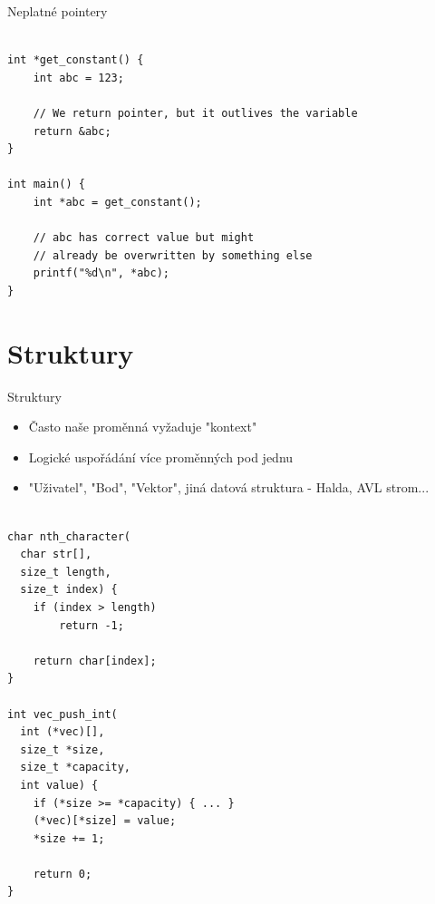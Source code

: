 \documentclass{beamer}
\begin{document}
\begin{frame}[fragile]{Neplatné pointery}

\begin{verbatim}

int *get_constant() {
    int abc = 123;

    // We return pointer, but it outlives the variable
    return &abc;
}

int main() {
    int *abc = get_constant();

    // abc has correct value but might
    // already be overwritten by something else
    printf("%d\n", *abc);
}
\end{verbatim}

\end{frame}

\section{Struktury}

\begin{frame}{Struktury}

\begin{itemize}
    \item Často naše proměnná vyžaduje "kontext"
    \item Logické uspořádání více proměnných pod jednu
    \item "Uživatel", "Bod", "Vektor", jiná datová struktura - Halda, AVL strom...
\end{itemize}
    
\end{frame}

\begin{frame}[fragile]

{\small
\begin{verbatim}

char nth_character(
  char str[],
  size_t length,
  size_t index) {
    if (index > length)
        return -1;

    return char[index];
}

int vec_push_int(
  int (*vec)[],
  size_t *size,
  size_t *capacity,
  int value) {
    if (*size >= *capacity) { ... }
    (*vec)[*size] = value;
    *size += 1;

    return 0;
}

\end{verbatim}
}

\end{frame}
\end{document}
